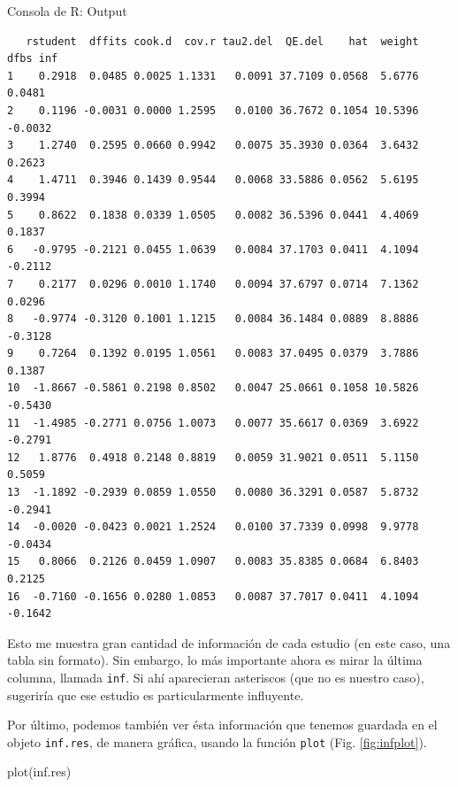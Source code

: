 \documentclass[
  bookmarksnumbered]{article}
\newenvironment{Shaded}{\begin{snugshade}}{\end{snugshade}}
\newcommand{\FunctionTok}[1]{\textcolor[rgb]{0.39,0.29,0.61}{#1}}
\newcommand{\NormalTok}[1]{\textcolor[rgb]{0.12,0.11,0.11}{#1}}
\begin{document}
\begin{ROut}{Consola de R: Output~\thetcbcounter}
                \begin{footnotesize}
                \begin{verbatim} 
   rstudent  dffits cook.d  cov.r tau2.del  QE.del    hat  weight    dfbs inf 
1    0.2918  0.0485 0.0025 1.1331   0.0091 37.7109 0.0568  5.6776  0.0481     
2    0.1196 -0.0031 0.0000 1.2595   0.0100 36.7672 0.1054 10.5396 -0.0032     
3    1.2740  0.2595 0.0660 0.9942   0.0075 35.3930 0.0364  3.6432  0.2623     
4    1.4711  0.3946 0.1439 0.9544   0.0068 33.5886 0.0562  5.6195  0.3994     
5    0.8622  0.1838 0.0339 1.0505   0.0082 36.5396 0.0441  4.4069  0.1837     
6   -0.9795 -0.2121 0.0455 1.0639   0.0084 37.1703 0.0411  4.1094 -0.2112     
7    0.2177  0.0296 0.0010 1.1740   0.0094 37.6797 0.0714  7.1362  0.0296     
8   -0.9774 -0.3120 0.1001 1.1215   0.0084 36.1484 0.0889  8.8886 -0.3128     
9    0.7264  0.1392 0.0195 1.0561   0.0083 37.0495 0.0379  3.7886  0.1387     
10  -1.8667 -0.5861 0.2198 0.8502   0.0047 25.0661 0.1058 10.5826 -0.5430     
11  -1.4985 -0.2771 0.0756 1.0073   0.0077 35.6617 0.0369  3.6922 -0.2791     
12   1.8776  0.4918 0.2148 0.8819   0.0059 31.9021 0.0511  5.1150  0.5059     
13  -1.1892 -0.2939 0.0859 1.0550   0.0080 36.3291 0.0587  5.8732 -0.2941     
14  -0.0020 -0.0423 0.0021 1.2524   0.0100 37.7339 0.0998  9.9778 -0.0434     
15   0.8066  0.2126 0.0459 1.0907   0.0083 35.8385 0.0684  6.8403  0.2125     
16  -0.7160 -0.1656 0.0280 1.0853   0.0087 37.7017 0.0411  4.1094 -0.1642     
 \end{verbatim}
                \end{footnotesize}
                \end{ROut}

Esto me muestra gran cantidad de información de cada estudio (en este caso, una tabla sin formato). Sin embargo, lo más importante ahora es mirar la última columna, llamada \texttt{inf}. Si ahí aparecieran asteriscos (que no es nuestro caso), sugeriría que ese estudio es particularmente influyente.

Por último, podemos también ver ésta información que tenemos guardada en el objeto \texttt{inf.res}, de manera gráfica, usando la función \texttt{plot} (Fig. \ref{fig:infplot}).

\begin{Shaded}
\begin{Highlighting}[]
\FunctionTok{plot}\NormalTok{(inf.res)}
\end{Highlighting}
\end{Shaded}
\end{document}
